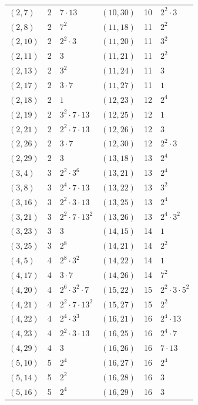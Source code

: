 \documentclass[11pt]{article}
\begin{document}
\begin{longtable}{@{}lrl@{\qquad}lrl@{}}
$(2,7)$ & 2 & $7\cdot 13$ & $(10,30)$ & 10 & $2^{2}\cdot 3$\\
$(2,8)$ & 2 & $7^{2}$ & $(11,18)$ & 11 & $2^{2}$\\
$(2,10)$ & 2 & $2^{2}\cdot 3$ & $(11,20)$ & 11 & $3^{2}$\\
$(2,11)$ & 2 & $3$ & $(11,21)$ & 11 & $2^{2}$\\
$(2,13)$ & 2 & $3^{2}$ & $(11,24)$ & 11 & $3$\\
$(2,17)$ & 2 & $3\cdot 7$ & $(11,27)$ & 11 & $1$\\
$(2,18)$ & 2 & $1$ & $(12,23)$ & 12 & $2^{4}$\\
$(2,19)$ & 2 & $3^{2}\cdot 7\cdot 13$ & $(12,25)$ & 12 & $1$\\
$(2,21)$ & 2 & $2^{2}\cdot 7\cdot 13$ & $(12,26)$ & 12 & $3$\\
$(2,26)$ & 2 & $3\cdot 7$ & $(12,30)$ & 12 & $2^{2}\cdot 3$\\
$(2,29)$ & 2 & $3$ & $(13,18)$ & 13 & $2^{4}$\\
$(3,4)$ & 3 & $2^{2}\cdot 3^{6}$ & $(13,21)$ & 13 & $2^{4}$\\
$(3,8)$ & 3 & $2^{4}\cdot 7\cdot 13$ & $(13,22)$ & 13 & $3^{2}$\\
$(3,16)$ & 3 & $2^{2}\cdot 3\cdot 13$ & $(13,25)$ & 13 & $2^{4}$\\
$(3,21)$ & 3 & $2^{2}\cdot 7\cdot 13^{2}$ & $(13,26)$ & 13 & $2^{4}\cdot 3^{2}$\\
$(3,23)$ & 3 & $3$ & $(14,15)$ & 14 & $1$\\
$(3,25)$ & 3 & $2^{8}$ & $(14,21)$ & 14 & $2^{2}$\\
$(4,5)$ & 4 & $2^{8}\cdot 3^{2}$ & $(14,22)$ & 14 & $1$\\
$(4,17)$ & 4 & $3\cdot 7$ & $(14,26)$ & 14 & $7^{2}$\\
$(4,20)$ & 4 & $2^{6}\cdot 3^{2}\cdot 7$ & $(15,22)$ & 15 & $2^{2}\cdot 3\cdot 5^{2}$\\
$(4,21)$ & 4 & $2^{2}\cdot 7\cdot 13^{2}$ & $(15,27)$ & 15 & $2^{2}$\\
$(4,22)$ & 4 & $2^{4}\cdot 3^{3}$ & $(16,21)$ & 16 & $2^{4}\cdot 13$\\
$(4,23)$ & 4 & $2^{2}\cdot 3\cdot 13$ & $(16,25)$ & 16 & $2^{4}\cdot 7$\\
$(4,29)$ & 4 & $3$ & $(16,26)$ & 16 & $7\cdot 13$\\
$(5,10)$ & 5 & $2^{4}$ & $(16,27)$ & 16 & $2^{4}$\\
$(5,14)$ & 5 & $2^{2}$ & $(16,28)$ & 16 & $3$\\
$(5,16)$ & 5 & $2^{4}$ & $(16,29)$ & 16 & $3$\\

\end{longtable}
\end{document}
